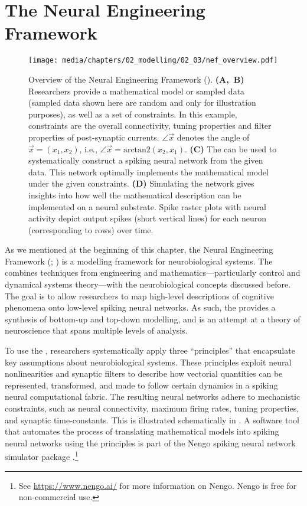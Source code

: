 
\section{The Neural Engineering Framework}
\label{sec:nef}

\begin{figure}[p]
	\texttt{[image: media/chapters/02\_modelling/02\_03/nef\_overview.pdf]}
	\caption[Overview of the Neural Engineering Framework]{Overview of the Neural Engineering Framework (\NEF).
	\textbf{(A,~B)} Researchers provide a mathematical model or sampled data (sampled data shown here are random and only for illustration purposes), as well as a set of constraints.
	In this example, constraints are the overall connectivity, tuning properties and filter properties of post-synaptic currents. $\angle \vec x$ denotes the angle of $\vec x = (x_1, x_2)$, i.e., $\angle \vec x = \mathrm{arctan2}(x_2, x_1)$. \textbf{(C)} The \NEF can be used to systematically construct a spiking neural network from the given data. This network optimally implements the mathematical model under the given constraints.
	\textbf{(D)} Simulating the network gives insights into how well the mathematical description can be implemented on a neural substrate.
	Spike raster plots with neural activity depict output spikes (short vertical lines) for each neuron (corresponding to rows) over time.}
	\label{fig:nef_overview}
\end{figure}

As we mentioned at the beginning of this chapter, the Neural Engineering Framework (\NEF; \cite{eliasmith2003neural}) is a modelling framework for neurobiological systems.
The \NEF combines techniques from engineering and mathematics---particularly control and dynamical systems theory---with the neurobiological concepts discussed before.
The goal is to allow researchers to map high-level descriptions of cognitive phenomena onto low-level spiking neural networks.
As such, the \NEF provides a synthesis of bottom-up and top-down modelling, and is an attempt at a theory of neuroscience that spans multiple levels of analysis.

To use the \NEF, researchers systematically apply three \enquote{principles} that encapsulate key assumptions about neurobiological systems.
These principles exploit neural nonlinearities and synaptic filters to describe how vectorial quantities can be represented, transformed, and made to follow certain dynamics in a spiking neural computational fabric.
The resulting neural networks adhere to mechanistic constraints, such as neural connectivity, maximum firing rates, tuning properties, and synaptic time-constants.
This is illustrated schematically in .
A software tool that automates the process of translating mathematical models into spiking neural networks using the \NEF principles is part of the Nengo spiking neural network simulator package \citep{bekolay2014nengo}.\footnote{See \url{https://www.nengo.ai/} for more information on Nengo. Nengo is free for non-commercial use.}



